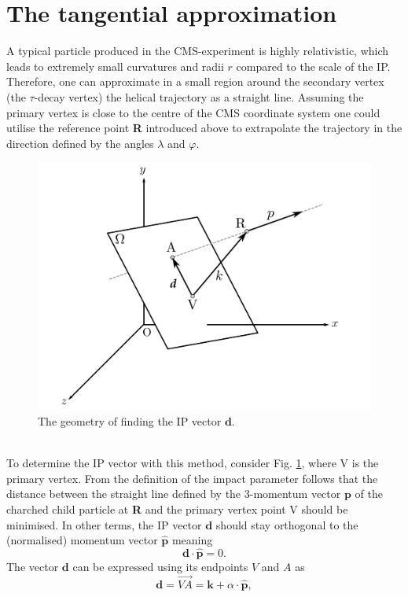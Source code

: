 \section{The tangential approximation}
\label{sec:tangential_approx}
A typical particle produced in the CMS-experiment is highly relativistic, which leads to extremely small curvatures and radii $r$ compared to the scale of the IP. Therefore, one can approximate in a small region around the secondary vertex (the $\tau$-decay vertex) the helical trajectory as a straight line. Assuming the primary vertex is close to the centre of the CMS coordinate system one could utilise the reference point \textbf{R} introduced above to extrapolate the trajectory in the direction defined by the angles $\lambda$ and $\varphi$.\\
\begin{figure}[h]
	\centering
	\includegraphics[width=0.7\linewidth]{Figures/IP_tangential_copie}
	\caption{The geometry of finding the IP vector $\boldsymbol{d}$. \parencite{Claudia_thesis}}
	\label{fig:iptangential}
\end{figure}\\
To determine the IP vector with this method, consider Fig. \ref{fig:iptangential}, where V is the primary vertex. From the definition of the impact parameter follows that the distance between the straight line defined by the 3-momentum vector $\boldsymbol{p}$ of the charched child particle at \textbf{R} and the primary vertex point V should be minimised. In other terms, the IP vector $\boldsymbol{d}$ should stay orthogonal to the (normalised) momentum vector $\boldsymbol{\hat{p}}$ meaning
\begin{equation}
	\boldsymbol{d} \cdot \boldsymbol{\hat{p}} = 0.
\end{equation}
The vector $\boldsymbol{d}$ can be expressed using its endpoints $V$ and $A$ as
\begin{equation}
	 \boldsymbol{d} = \overrightarrow{VA} = \boldsymbol{k}+\alpha \cdot \boldsymbol{\hat{p}},
\end{equation}
